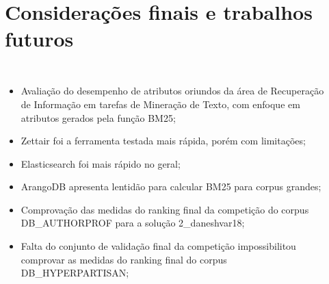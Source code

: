 \documentclass[%
  10pt,%
  aspectratio = 169,%
  compress,%
  t,%
]{beamer}%
\begin{document}
\section{Considerações finais e trabalhos futuros}\label{sec:consfinais}
    \begin{frame}{}{}
        \begin{columns}[t]
            \vspace{-0.5cm}
            \begin{itemize}
                \setlength{\leftmargin}{-1.5cm}
                \item  Avaliação do desempenho de atributos oriundos da área de Recuperação de Informação em tarefas de Mineração de Texto, com enfoque em atributos gerados pela função BM25;

                \item Zettair foi a ferramenta testada mais rápida, porém com limitações;

                \item Elasticsearch foi mais rápido no geral;
                
                \item ArangoDB apresenta lentidão para calcular BM25 para corpus grandes;
                
                \item Comprovação das medidas do ranking final da competição do corpus DB\_AUTHORPROF para a solução 2\_daneshvar18;
                
                \item Falta do conjunto de validação final da competição impossibilitou comprovar as medidas do ranking final do corpus DB\_HYPERPARTISAN;
            \end{itemize}

            \vspace{-0.5cm}
            \begin{itemize}
                

\end{itemize}
\end{columns}
\end{frame}
\end{document}
